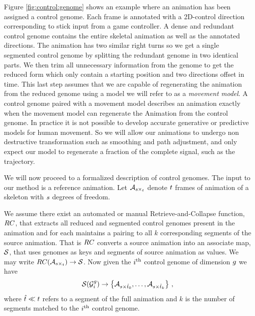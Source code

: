 Figure \ref{fig:control:genome} shows an example where an animation has been assigned a control genome. Each frame is annotated with a 2D-control direction corresponding to stick input from a game controller. A dense and redundant control genome contains the entire skeletal animation as well as the annotated directions. The animation has two similar right turns so we get a single segmented control genome by splitting the redundant genome in two identical parts. We then trim all unnecessary information from the genome to get the reduced form which only contain a starting position and two directions offset in time. This last step assumes that we are capable of regenerating the animation from the reduced genome using a model we will refer to as a \textit{movement model}. A control genome paired with a movement model describes an animation exactly when the movement model can regenerate the Animation from the control genome.  In practice it is not possible to develop accurate generative or predictive models for human movement. So we will allow our animations to undergo non destructive transformation such as smoothing and path adjustment, and only expect our model to regenerate a fraction of the complete signal, such as the trajectory. 

We will now proceed to a formalized description of control genomes. The input to our method is a reference animation. Let $\mathcal{A}_{s\times_t}$ denote $t$ frames of animation of a skeleton with $s$ degrees of freedom. 

We assume there exist an automated or manual Retrieve-and-Collapse function, ${RC}$,  that extracts all reduced and segmented control genomes present in the animation and for each maintains a pairing to all $k$ corresponding segments of the source animation. That is ${RC}$ converts a source animation into an associate map, $\mathcal{S}$, that uses genomes as keys and segments of source animation as values. We may write ${RC}(\mathcal{A}_{s\times_t}) \rightarrow \mathcal{S}$. Now given the $i ^{\text{th}}$ control genome of dimension $g$ we have
\begin{equation}
 \mathcal{S}(\mathcal{G}^g_i) \rightarrow \left\{\mathcal{A}_{s\times{\hat{t}}_0},\ldots,\mathcal{A}_{s\times{\hat{t}}_k}\right\}   \,,
\end{equation}
where ${\hat{t}}\ll t$ refers to a segment of the full animation and $k$ is the number of segments matched to the $i ^{\text{th}}$ control genome.

